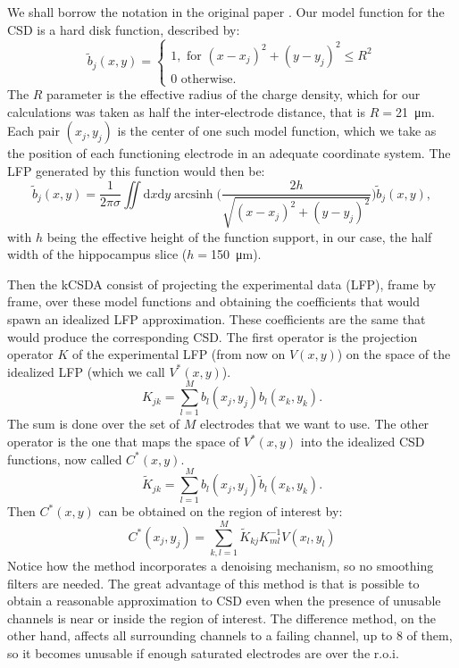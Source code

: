 \documentclass[utf8]{frontiersSCNS}
\DeclareMathOperator{\arcsinh}{arcsinh}
\newcommand{\mum}[1]{\SI{#1}{\micro\metre}}
\newcommand{\rd}{\mathrm{d}}
\begin{document}
We shall borrow the notation in the original paper \citep{Potworowski2011}. Our model function for the CSD is a hard disk function, described by:
\begin{equation}
  \tilde{b}_j(x,y)=\begin{cases}
  1, \text{ for } (x-x_j)^2+(y-y_j)^2 \leq R^2 \\
  0 \text{ otherwise.} 
  \end{cases}
\end{equation}
The $R$ parameter is the effective radius of the charge density, which for our
calculations was taken as half the inter-electrode distance, that is $R=$\mum{21}.
Each pair $(x_j, y_j)$ is the center of one such model function, which we take as
the position of each  functioning electrode in an adequate coordinate system.
The LFP generated by this function would then be:
\begin{equation}
  \tilde{b}_j(x,y)=\frac{1}{2\pi\sigma}
  \iint \! \rd x \rd y \arcsinh \biggr(
  \frac{2 h } {\sqrt{(x-x_j)^2+(y-y_j)^2}}
  \biggl)
  \tilde{b}_j(x,y),
\end{equation}
  with $h$ being the effective height of the function support, in our case,
  the half width of the hippocampus slice ($h=$\mum{150}).

Then the kCSDA consist of projecting the experimental data (LFP), frame by frame,
over these model functions and obtaining the  coefficients that would spawn an idealized
LFP approximation. These coefficients are the same that would produce the
corresponding CSD. The first operator is the projection operator $K$ of the experimental
LFP (from now on $V(x,y)$) on the space of the idealized LFP (which we call $V^* (x,y)$).
\begin{equation}
  K_{jk}=\sum_{l=1}^{M}b_l(x_j,y_j)b_l(x_k,y_k).
\end{equation}
The sum is done over the set of $M$ electrodes that we want to use.
The other operator is the one that maps the space of $V^*(x,y)$ into the idealized
CSD functions, now called $C^*(x,y)$. 
\begin{equation}
  \tilde{K}_{jk}=\sum_{l=1}^Mb_l(x_j,y_j)\tilde{b}_l(x_k,y_k).
\end{equation}
Then $C^*(x,y)$ can be obtained on the region of interest by:
\begin{equation}
  C^*(x_j,y_j)=\sum_{k,l=1}^M \tilde{K}_{kj} K^{-1}_{ml} V(x_l,y_l)
\end{equation}
Notice how the method incorporates a denoising mechanism, so
no smoothing filters are needed.
The great advantage of this method is that is possible to obtain a reasonable
approximation to CSD even when the presence of unusable channels is near or inside
the region of interest. The difference method, on the other hand, affects all surrounding
channels to a failing channel, up to 8 of them, so it becomes unusable if enough
saturated electrodes are over the r.o.i.
\end{document}
